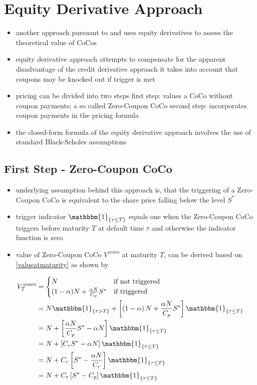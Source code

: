 \section{Equity Derivative Approach}

\begin{itemize}
\item another approach pursuant to \citet{de2011pricing} and \citet{de2014handbook} uses equity derivatives to assess the theoretical value of CoCos
\item equity derivative approach attempts to compensate for the apparent disadvantage of the credit derivative approach
	\subitem it takes into account that coupons may be knocked out if trigger is met
\item pricing can be divided into two steps
	\subitem first step: values a CoCo without coupon payments; a so called Zero-Coupon CoCo
	\subitem second step: incorporates coupon payments in the pricing formula 
\item the closed-form formula of the equity derivative approach involves the use of standard Black-Scholes assumptions
\end{itemize}

\subsection{First Step - Zero-Coupon CoCo}

\begin{itemize}
\item underlying assumption behind this approach is, that the triggering of a Zero-Coupon CoCo is equivalent to the share price falling below the level $S^*$
\item trigger indicator $\mathbbm{1}_{\{ \tau \leq T \}}$ equals one when the Zero-Coupon CoCo triggers before maturity $T$ at default time $\tau$ and otherwise the indicator function is zero
\item value of Zero-Coupon CoCo $V^{zcoco}$ at maturity $T$, can be derived based on \ref{valueatmaturity} as shown by \citet{erismann2015pricing}
\end{itemize}
\begin{align} \label{pvedcoco}    
    V^{zcoco}_T &= \begin{cases} N & \text{if not triggered}\\ (1 - \alpha) N + \frac{\alpha N}{C_p} S^{*} & \text{if triggered} \end{cases} \nonumber\\
    &= N \mathbbm{1}_{\{ \tau > T \}} +\left[ \left( 1 - \alpha \right) N + \dfrac{\alpha N}{C_p } S^* \right] \mathbbm{1}_{\{ \tau \leq T \}}\nonumber\\
    &= N + \left[ \dfrac{\alpha N}{C_p} S^* - \alpha N \right] \mathbbm{1}_{\{ \tau \leq T \}}\nonumber\\
    &= N + \left[ C_r S^* - \alpha N \right] \mathbbm{1}_{\{ \tau \leq T \}}\nonumber\\
    &= N + C_r \left[S^* - \dfrac{\alpha N}{C_r}\right] \mathbbm{1}_{\{ \tau \leq T \}}\nonumber\\
    &= N + C_r \left[ S^* - C_p \right] \mathbbm{1}_{\{ \tau \leq T \}}
\end{align}

